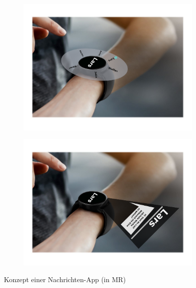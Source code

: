 \documentclass[11pt, a4paper]{article}
\begin{document}
\begin{figure}[h]
	\begin{subfigure}[c]{0.35\textwidth}
        \centering
		\includegraphics[scale=.25]{assets/Messages_1.png}
	\end{subfigure}
	\begin{subfigure}[c]{0.4\textwidth}
        \centering
		\includegraphics[scale=.25]{assets/Messages_2.png}
	\end{subfigure}
    \centering
	\caption{Konzept einer Nachrichten-App (in MR)}
    \label{fig:concept_of_a_messageApp}
\end{figure}
\end{document}
